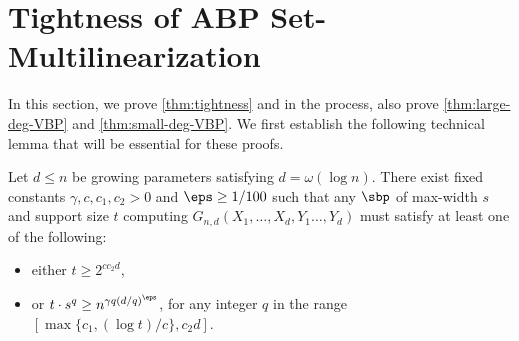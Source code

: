 \documentclass{article}
\begin{document}
\section{Tightness of ABP Set-Multilinearization}\label{sec:tightness}

In this section, we prove \autoref{thm:tightness} and in the process, also prove \autoref{thm:large-deg-VBP} and \autoref{thm:small-deg-VBP}. We first establish the following technical lemma that will be essential for these proofs. 

\begin{lem}\label{lem:VBP}
Let $d\leq n$ be growing parameters satisfying $d = \omega(\log n)$. There exist fixed constants $\gamma,c,c_1,c_2>0$ and $\eps\geq 1/100$ such that any $\sbp$ of max-width $s$ and support size $t$ computing $G_{n,d}(X_1,\ldots,X_d,Y_1\ldots,Y_d)$ must satisfy at least one of the following:
\begin{itemize}
    \item either $t\geq 2^{cc_2d}$,
    \item or $t\cdot s^q \geq n^{{{\gamma q(d/q)^\eps}}}$, for any integer $q$ in the range $ [\max\{c_1,(\log t)/c\}, c_2d]$.
\end{itemize}
\end{lem}
\end{document}

